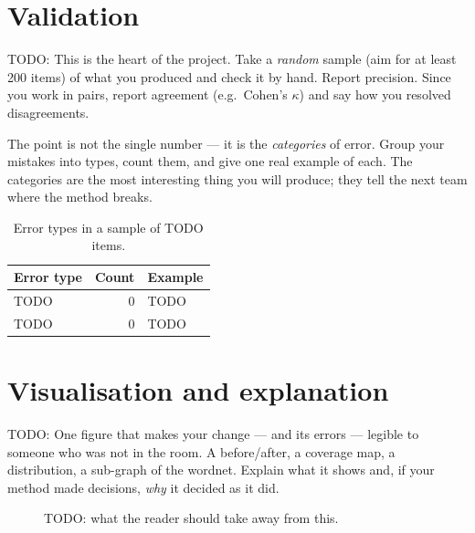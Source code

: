 \documentclass[a4paper,12pt]{article}
\begin{document}
\section{Validation}

TODO: This is the heart of the project.  Take a \emph{random} sample
(aim for at least 200 items) of what you produced and check it by hand.
Report precision.  Since you work in pairs, report agreement
(e.g.\ Cohen's $\kappa$) and say how you resolved disagreements.

The point is not the single number --- it is the \emph{categories} of
error.  Group your mistakes into types, count them, and give one real
example of each.  The categories are the most interesting thing you
will produce; they tell the next team where the method breaks.

\begin{table}[ht]
  \centering
  \begin{tabular}{lrl}
    \toprule
    Error type & Count & Example \\
    \midrule
    TODO & 0 & TODO \\
    TODO & 0 & TODO \\
    \bottomrule
  \end{tabular}
  \caption{Error types in a sample of TODO items.}
  \label{tab:errors}
\end{table}

\section{Visualisation and explanation}

TODO: One figure that makes your change --- and its errors --- legible
to someone who was not in the room.  A before/after, a coverage map, a
distribution, a sub-graph of the wordnet.  Explain what it shows and,
if your method made decisions, \emph{why} it decided as it did.

\begin{figure}[ht]
  \centering
  \caption{TODO: what the reader should take away from this.}
  \label{fig:main}
\end{figure}

\end{document}
